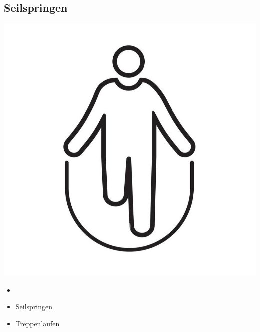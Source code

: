     \subsection{Seilspringen}
    \begin{minipage}{0.34\linewidth}
        \includegraphics[width = \linewidth]{src/1_kreislauf/images/seilspringen_piktogramm.jpg}
    \end{minipage}
    \begin{minipage}{0.64\linewidth}
        \begin{itemize}
            \item 
        \end{itemize}
    \end{minipage}

\begin{itemize}
    \item Seilspringen
    \item Treppenlaufen
\end{itemize}
